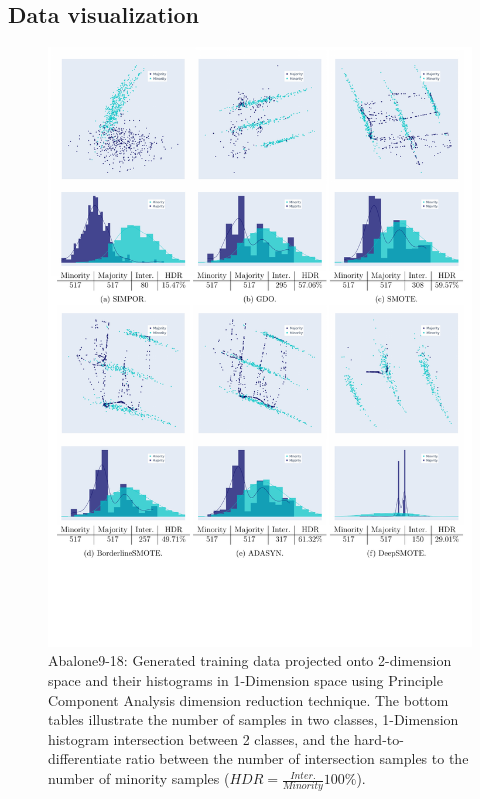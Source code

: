 \subsection{Data visualization}  

\begin{figure}[h!]
	\centering
	\includegraphics[width=0.8\linewidth,trim=10 90 10 10, clip ]{Figures/PCA/abalone9-18}
	\caption{Abalone9-18: Generated training data projected onto 2-dimension space and their histograms in 1-Dimension space using Principle Component Analysis dimension reduction technique. The bottom tables illustrate the number of samples in two classes, 1-Dimension histogram intersection between 2 classes, and the hard-to-differentiate ratio between the number of intersection samples to the number of minority samples ($HDR = \frac{Inter.}{Minority}100\%$).}
	\label{fig:visualization1d2d}
\end{figure}

